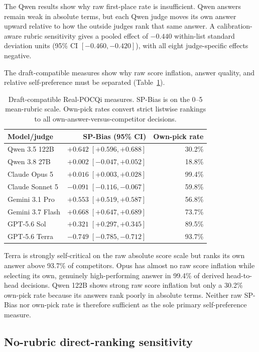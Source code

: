 \documentclass[11pt]{article}
\begin{document}
The Qwen results show why raw first-place rate is insufficient. Qwen answers
remain weak in absolute terms, but each Qwen judge moves its own answer upward
relative to how the outside judges rank that same answer. A
calibration-aware rubric sensitivity gives a pooled effect of $-0.440$
within-list standard deviation units (95\% CI $[-0.460,-0.420]$), with all
eight judge-specific effects negative.

The draft-compatible measures show why raw score inflation, answer quality,
and relative self-preference must be separated
(Table~\ref{tab:real-draft-scores}).

\begin{table}[htbp]
\centering
\small
\caption{Draft-compatible Real-POCQi measures. SP-Bias is on the 0--5
mean-rubric scale. Own-pick rates convert strict listwise rankings to all
own-answer-versus-competitor decisions.}
\label{tab:real-draft-scores}
\begin{tabular}{lrr}
\toprule
Model/judge & SP-Bias (95\% CI) & Own-pick rate \\
\midrule
Qwen 3.5 122B & $+0.642\;[+0.596,+0.688]$ & 30.2\% \\
Qwen 3.8 27B & $+0.002\;[-0.047,+0.052]$ & 18.8\% \\
Claude Opus 5 & $+0.016\;[+0.003,+0.028]$ & 99.4\% \\
Claude Sonnet 5 & $-0.091\;[-0.116,-0.067]$ & 59.8\% \\
Gemini 3.1 Pro & $+0.553\;[+0.519,+0.587]$ & 56.8\% \\
Gemini 3.7 Flash & $+0.668\;[+0.647,+0.689]$ & 73.7\% \\
GPT-5.6 Sol & $+0.321\;[+0.297,+0.345]$ & 89.5\% \\
GPT-5.6 Terra & $-0.749\;[-0.785,-0.712]$ & 93.7\% \\
\bottomrule
\end{tabular}
\end{table}
\FloatBarrier

Terra is strongly self-critical on the raw absolute score scale but ranks its
own answer above 93.7\% of competitors. Opus has almost no raw score inflation
while selecting its own, genuinely high-performing answer in 99.4\% of derived
head-to-head decisions. Qwen 122B shows strong raw score inflation but only a
30.2\% own-pick rate because its answers rank poorly in absolute terms. Neither
raw SP-Bias nor own-pick rate is therefore sufficient as the sole primary
self-preference measure.

\subsection{No-rubric direct-ranking sensitivity}
\end{document}
